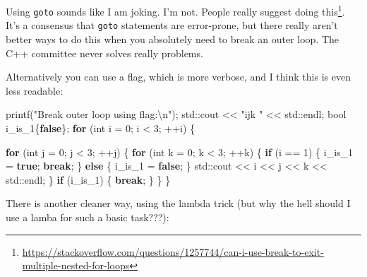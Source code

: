 \documentclass[
]{book}
\newenvironment{Shaded}{\begin{snugshade}}{\end{snugshade}}
\newcommand{\BuiltInTok}[1]{#1}
\newcommand{\ControlFlowTok}[1]{\textcolor[rgb]{0.13,0.29,0.53}{\textbf{#1}}}
\newcommand{\DataTypeTok}[1]{\textcolor[rgb]{0.13,0.29,0.53}{#1}}
\newcommand{\DecValTok}[1]{\textcolor[rgb]{0.00,0.00,0.81}{#1}}
\newcommand{\KeywordTok}[1]{\textcolor[rgb]{0.13,0.29,0.53}{\textbf{#1}}}
\newcommand{\NormalTok}[1]{#1}
\newcommand{\SpecialCharTok}[1]{\textcolor[rgb]{0.00,0.00,0.00}{#1}}
\newcommand{\StringTok}[1]{\textcolor[rgb]{0.31,0.60,0.02}{#1}}
\begin{document}
Using \texttt{goto} sounds like I am joking. I'm not. People really suggest doing this\footnote{\url{https://stackoverflow.com/questions/1257744/can-i-use-break-to-exit-multiple-nested-for-loops}}. It's a consensus that \texttt{goto} statements are error-prone, but there really aren't better ways to do this when you absolutely need to break an outer loop. The C++ committee never solves really problems.

Alternatively you can use a flag, which is more verbose, and I think this is even less readable:

\begin{Shaded}
\begin{Highlighting}[]
\NormalTok{printf(}\StringTok{"Break outer loop using flag:}\SpecialCharTok{\textbackslash{}n}\StringTok{"}\NormalTok{);}
\BuiltInTok{std::}\NormalTok{cout \textless{}\textless{} }\StringTok{"ijk "}\NormalTok{ \textless{}\textless{} }\BuiltInTok{std::}\NormalTok{endl;}
\DataTypeTok{bool}\NormalTok{ i\_is\_1\{}\KeywordTok{false}\NormalTok{\};}
\ControlFlowTok{for}\NormalTok{ (}\DataTypeTok{int}\NormalTok{ i = }\DecValTok{0}\NormalTok{; i \textless{} }\DecValTok{3}\NormalTok{; ++i)}
\NormalTok{\{}

    \ControlFlowTok{for}\NormalTok{ (}\DataTypeTok{int}\NormalTok{ j = }\DecValTok{0}\NormalTok{; j \textless{} }\DecValTok{3}\NormalTok{; ++j)}
\NormalTok{    \{}
        \ControlFlowTok{for}\NormalTok{ (}\DataTypeTok{int}\NormalTok{ k = }\DecValTok{0}\NormalTok{; k \textless{} }\DecValTok{3}\NormalTok{; ++k)}
\NormalTok{        \{}
            \ControlFlowTok{if}\NormalTok{ (i == }\DecValTok{1}\NormalTok{)}
\NormalTok{            \{}
\NormalTok{                i\_is\_1 = }\KeywordTok{true}\NormalTok{;}
                \ControlFlowTok{break}\NormalTok{;}
\NormalTok{            \}}
            \ControlFlowTok{else}
\NormalTok{            \{}
\NormalTok{                i\_is\_1 = }\KeywordTok{false}\NormalTok{;}
\NormalTok{            \}}
            \BuiltInTok{std::}\NormalTok{cout \textless{}\textless{} i \textless{}\textless{} j \textless{}\textless{} k \textless{}\textless{} }\BuiltInTok{std::}\NormalTok{endl;}
\NormalTok{        \}}
        \ControlFlowTok{if}\NormalTok{ (i\_is\_1)}
\NormalTok{        \{}
            \ControlFlowTok{break}\NormalTok{;}
\NormalTok{        \}}
\NormalTok{    \}}
\NormalTok{\}}
\end{Highlighting}
\end{Shaded}

There is another cleaner way, using the lambda trick (but why the hell should I use a lamba for such a basic task???):
\end{document}
